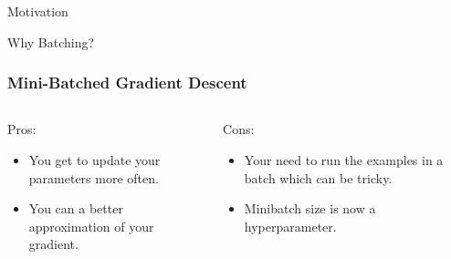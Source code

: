 \documentclass{beamer}
\begin{document}
\begin{section}{Motivation}
\begin{subsection}{Why Batching?}
        \begin{frame}
            \frametitle{Mini-Batched Gradient Descent}
            \begin{columns}
                \begin{column}{0.5\textwidth}
                    Pros:
                    \begin{itemize}
                        \item You get to update your parameters more often.
                        \item You can a better approximation of your gradient.
                    \end{itemize}
                \end{column}
                \begin{column}{0.5\textwidth}
                    Cons:
                    \begin{itemize}
                        \item Your need to run the examples in a batch which can be tricky.
                        \item Minibatch size is now a hyperparameter.
                    \end{itemize}
                \end{column}
            \end{columns}
        \end{frame}


\end{subsection}
\end{section}
\end{document}
